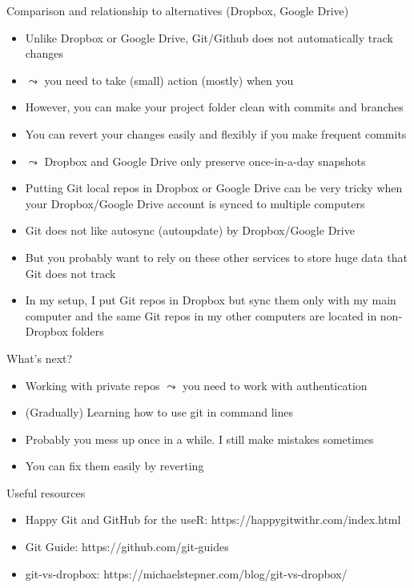 \documentclass[handout,pdftex,10pt,aspectratio=169]{beamer}
\newcommand{\backupbegin}{
  \newcounter{finalframe}
  \setcounter{finalframe}{\value{framenumber}}
}
\newcommand{\backupend}{
  \setcounter{framenumber}{\value{finalframe}}
}
\begin{document}
\begin{frame}{Comparison and relationship to alternatives (Dropbox, Google Drive)}
  \begin{itemize}[<+->]
    \item Unlike Dropbox or Google Drive, Git/Github does not automatically track changes 
    \item[] $\leadsto$ you need to take (small) action (mostly) when you 
    \item However, you can make your project folder clean with commits and branches
    \item You can revert your changes easily and flexibly if you make frequent commits 
    \item[] $\leadsto$ Dropbox and Google Drive only preserve once-in-a-day snapshots
    \bigskip
    \item Putting Git local repos in Dropbox or Google Drive can be very tricky
    when your Dropbox/Google Drive account is synced to multiple computers
    \item Git does not like autosync (autoupdate) by Dropbox/Google Drive
    \item But you probably want to rely on these other services to store huge data that Git does not track
    \item In my setup, I put Git repos in Dropbox but sync them only with my main computer and 
      the same Git repos in my other computers are located in non-Dropbox folders
  \end{itemize}
\end{frame}


\begin{frame}{What's next?}
  \begin{itemize}[<+->]
    \item Working with private repos $\leadsto$ you need to work with authentication
    \item (Gradually) Learning how to use git in command lines
    \medskip
    \item Probably you mess up once in a while. I still make mistakes sometimes 
    \item You can fix them easily by reverting
  \end{itemize}
\end{frame}


\begin{frame}{Useful resources}
  \begin{itemize}
    \item Happy Git and GitHub for the useR: https://happygitwithr.com/index.html
    \item Git Guide: https://github.com/git-guides
    \item git-vs-dropbox: https://michaelstepner.com/blog/git-vs-dropbox/
  \end{itemize}
\end{frame}


\backupbegin
\backupend
\end{document}
